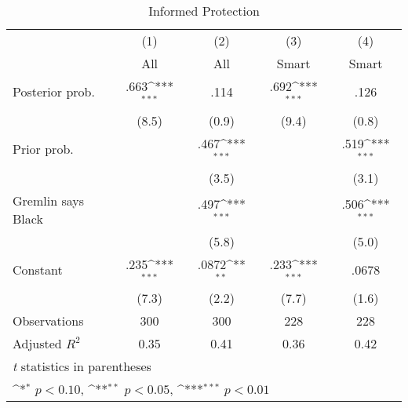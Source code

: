 \begin{table}[htbp]\centering
\def\sym#1{\ifmmode^{#1}\else\(^{#1}\)\fi}
\caption{Informed Protection}
\begin{tabular}{l*{4}{c}}
\hline\hline
                &\multicolumn{1}{c}{(1)}&\multicolumn{1}{c}{(2)}&\multicolumn{1}{c}{(3)}&\multicolumn{1}{c}{(4)}\\
                &\multicolumn{1}{c}{All}&\multicolumn{1}{c}{All}&\multicolumn{1}{c}{Smart}&\multicolumn{1}{c}{Smart}\\
\hline
Posterior prob. &     .663\sym{***}&     .114         &     .692\sym{***}&     .126         \\
                &    (8.5)         &    (0.9)         &    (9.4)         &    (0.8)         \\
Prior prob.     &                  &     .467\sym{***}&                  &     .519\sym{***}\\
                &                  &    (3.5)         &                  &    (3.1)         \\
Gremlin says Black&                  &     .497\sym{***}&                  &     .506\sym{***}\\
                &                  &    (5.8)         &                  &    (5.0)         \\
Constant        &     .235\sym{***}&    .0872\sym{**} &     .233\sym{***}&    .0678         \\
                &    (7.3)         &    (2.2)         &    (7.7)         &    (1.6)         \\
\hline
Observations    &      300         &      300         &      228         &      228         \\
Adjusted \(R^{2}\)&     0.35         &     0.41         &     0.36         &     0.42         \\
\hline\hline
\multicolumn{5}{l}{\footnotesize \textit{t} statistics in parentheses}\\
\multicolumn{5}{l}{\footnotesize \sym{*} \(p<0.10\), \sym{**} \(p<0.05\), \sym{***} \(p<0.01\)}\\
\end{tabular}
\end{table}
